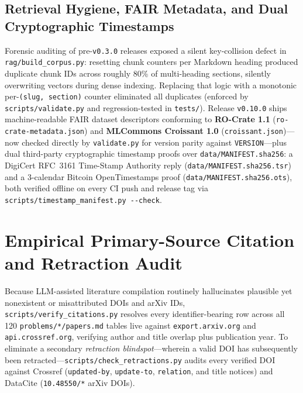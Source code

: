 \documentclass[11pt,reqno]{amsart}
\theoremstyle{plain}
\theoremstyle{definition}
\newcommand{\code}[1]{{\upshape\nolinkurl{#1}}}
\begin{document}
\subsection{Retrieval Hygiene, FAIR Metadata, and Dual Cryptographic Timestamps}
Forensic auditing of pre-\texttt{v0.3.0} releases exposed a silent key-collision defect in
\code{rag/build_corpus.py}: resetting chunk counters per Markdown heading produced duplicate
chunk IDs across roughly 80\% of multi-heading sections, silently overwriting vectors during
dense indexing. Replacing that logic with a monotonic per-\code{(slug, section)} counter
eliminated all duplicates (enforced by \code{scripts/validate.py} and regression-tested in
\code{tests/}). Release \texttt{v0.10.0} ships machine-readable FAIR dataset descriptors
conforming to \textbf{RO-Crate 1.1} (\code{ro-crate-metadata.json}) and \textbf{MLCommons
Croissant 1.0} (\code{croissant.json})---now checked directly by \code{validate.py} for version
parity against \code{VERSION}---plus dual third-party cryptographic timestamp proofs over
\code{data/MANIFEST.sha256}: a DigiCert RFC~3161 Time-Stamp Authority reply
(\code{data/MANIFEST.sha256.tsr}) and a 3-calendar Bitcoin OpenTimestamps proof
(\code{data/MANIFEST.sha256.ots}), both verified offline on every CI push and release tag via
\code{scripts/timestamp_manifest.py --check}.

\section{Empirical Primary-Source Citation and Retraction Audit}\label{sec:citations}

Because LLM-assisted literature compilation routinely hallucinates plausible yet nonexistent or
misattributed DOIs and arXiv IDs, \code{scripts/verify_citations.py} resolves every
identifier-bearing row across all 120 \code{problems/*/papers.md} tables live against
\code{export.arxiv.org} and \code{api.crossref.org}, verifying author and title overlap plus
publication year. To eliminate a secondary \emph{retraction blindspot}---wherein a valid DOI
has subsequently been retracted---\code{scripts/check_retractions.py} audits every verified DOI
against Crossref (\code{updated-by}, \code{update-to}, \code{relation}, and title notices) and
DataCite (\code{10.48550/*} arXiv DOIs).
\end{document}
